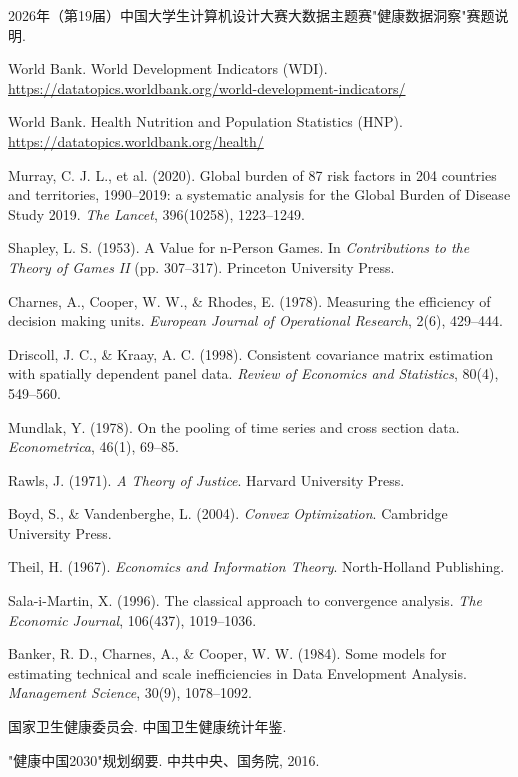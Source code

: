 \documentclass[12pt,a4paper]{ctexart}
\begin{document}
\begin{enumerate}[leftmargin=1.5em,label={[\arabic*]}]
    \item 2026年（第19届）中国大学生计算机设计大赛大数据主题赛"健康数据洞察"赛题说明.
    \item World Bank. World Development Indicators (WDI). \url{https://datatopics.worldbank.org/world-development-indicators/}
    \item World Bank. Health Nutrition and Population Statistics (HNP). \url{https://datatopics.worldbank.org/health/}
    \item Murray, C. J. L., et al. (2020). Global burden of 87 risk factors in 204 countries and territories, 1990--2019: a systematic analysis for the Global Burden of Disease Study 2019. \textit{The Lancet}, 396(10258), 1223--1249.
    \item Shapley, L. S. (1953). A Value for n-Person Games. In \textit{Contributions to the Theory of Games II} (pp. 307--317). Princeton University Press.
    \item Charnes, A., Cooper, W. W., \& Rhodes, E. (1978). Measuring the efficiency of decision making units. \textit{European Journal of Operational Research}, 2(6), 429--444.
    \item Driscoll, J. C., \& Kraay, A. C. (1998). Consistent covariance matrix estimation with spatially dependent panel data. \textit{Review of Economics and Statistics}, 80(4), 549--560.
    \item Mundlak, Y. (1978). On the pooling of time series and cross section data. \textit{Econometrica}, 46(1), 69--85.
    \item Rawls, J. (1971). \textit{A Theory of Justice}. Harvard University Press.
    \item Boyd, S., \& Vandenberghe, L. (2004). \textit{Convex Optimization}. Cambridge University Press.
    \item Theil, H. (1967). \textit{Economics and Information Theory}. North-Holland Publishing.
    \item Sala-i-Martin, X. (1996). The classical approach to convergence analysis. \textit{The Economic Journal}, 106(437), 1019--1036.
    \item Banker, R. D., Charnes, A., \& Cooper, W. W. (1984). Some models for estimating technical and scale inefficiencies in Data Envelopment Analysis. \textit{Management Science}, 30(9), 1078--1092.
    \item 国家卫生健康委员会. 中国卫生健康统计年鉴.
    \item "健康中国2030"规划纲要. 中共中央、国务院, 2016.
\end{enumerate}
\end{document}

